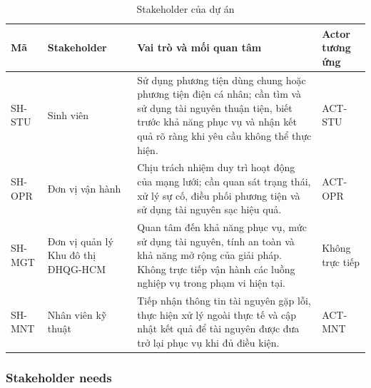 \begin{table}[htbp]
  \centering
  \caption{Stakeholder của dự án}
  \label{tab:stakeholders}
  \small
  \begin{tabularx}{\textwidth}{|L{20mm}|L{34mm}|Y|L{29mm}|}
    \hline
    \textbf{Mã} & \centering\arraybackslash\textbf{Stakeholder} & \centering\arraybackslash\textbf{Vai trò và mối quan tâm} & \centering\arraybackslash\textbf{Actor tương ứng}\\
    \hline
    SH-STU & Sinh viên & Sử dụng phương tiện dùng chung hoặc phương tiện điện cá nhân; cần tìm và sử dụng tài nguyên thuận tiện, biết trước khả năng phục vụ và nhận kết quả rõ ràng khi yêu cầu không thể thực hiện. & ACT-STU\\
    \hline
    SH-OPR & Đơn vị vận hành & Chịu trách nhiệm duy trì hoạt động của mạng lưới; cần quan sát trạng thái, xử lý sự cố, điều phối phương tiện và sử dụng tài nguyên sạc hiệu quả. & ACT-OPR\\
    \hline
    SH-MGT & Đơn vị quản lý Khu đô thị ĐHQG-HCM & Quan tâm đến khả năng phục vụ, mức sử dụng tài nguyên, tính an toàn và khả năng mở rộng của giải pháp. Không trực tiếp vận hành các luồng nghiệp vụ trong phạm vi hiện tại. & Không trực tiếp\\
    \hline
    SH-MNT & Nhân viên kỹ thuật & Tiếp nhận thông tin tài nguyên gặp lỗi, thực hiện xử lý ngoài thực tế và cập nhật kết quả để tài nguyên được đưa trở lại phục vụ khi đủ điều kiện. & ACT-MNT\\
    \hline
  \end{tabularx}
\end{table}

\subsubsection*{Stakeholder needs}

